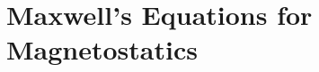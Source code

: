 \documentclass[../electromagnetism]{subfiles}
\begin{document}
\section{Maxwell's Equations for Magnetostatics}
\end{document}

